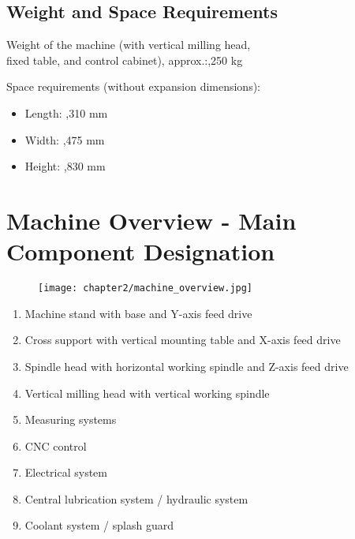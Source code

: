 
\subsection{Weight and Space Requirements}
Weight of the machine (with vertical milling head, \\
fixed table, and control cabinet), approx.:,250 kg

Space requirements (without expansion dimensions):
\begin{itemize}
    \item Length: ,310 mm
    \item Width: ,475 mm
    \item Height: ,830 mm
\end{itemize}

\section{Machine Overview - Main Component Designation}

\begin{figure}[h]
    \centering
    \texttt{[image: chapter2/machine\_overview.jpg]}
    \caption{}
    \label{fig:machine_overview}
\end{figure}

\vspace{3cm}

\begin{enumerate}[itemsep=1pt,parsep=0pt]
    \item Machine stand with base and Y-axis feed drive
    \item Cross support with vertical mounting table and X-axis feed drive
    \item Spindle head with horizontal working spindle and Z-axis feed drive
    \item Vertical milling head with vertical working spindle
    \item Measuring systems
    \item CNC control
    \item Electrical system
    \item Central lubrication system / hydraulic system
    \item Coolant system / splash guard
\end{enumerate}



